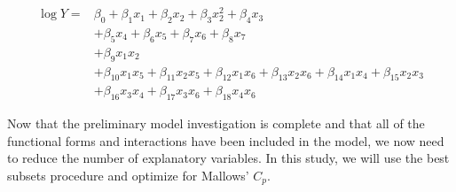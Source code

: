 \documentclass{article}
\begin{document}
      \begin{align*}
        \log{Y} = &\beta_0 + \beta_1 x_1 + \beta_2 x_2 + \beta_3 x_2^2 + \beta_4 x_3 \\
                    &+ \beta_5 x_4 + \beta_6 x_5 + \beta_7 x_6 + \beta_8 x_7 \\
                    &+ \beta_9 x_1 x_2 \\
                    &+ \beta_{10} x_1 x_5 + \beta_{11} x_2 x_5 + \beta_{12} x_1 x_6 + \beta_{13} x_2 x_6 + \beta_{14} x_1 x_4 + \beta_{15} x_2 x_3 \\
                    &+ \beta_{16} x_3 x_4 + \beta_{17} x_3 x_6 + \beta_{18} x_4 x_6
      \end{align*}

      Now that the preliminary model investigation is complete and that all of the
      functional forms and interactions have been included in the model, we now
      need to reduce the number of explanatory variables. In this study, we will
      use the best subsets procedure and optimize for Mallows' $C_p$.
\end{document}
